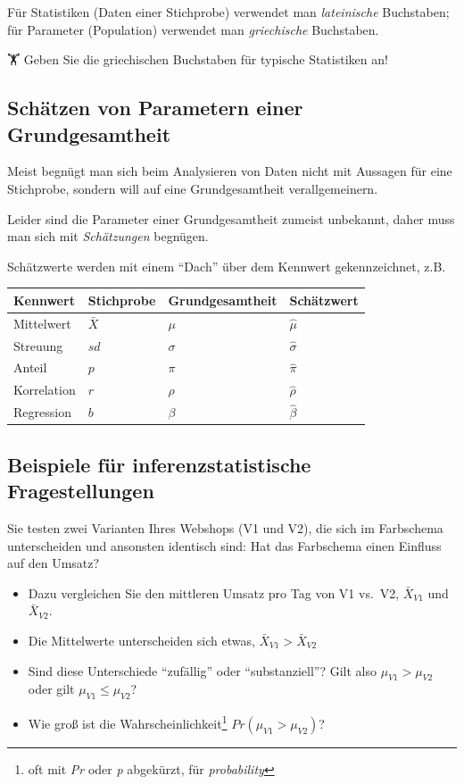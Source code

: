 \documentclass[
  a4paper,
  DIV=11]{scrreprt}
\theoremstyle{definition}
\theoremstyle{remark}
\begin{document}
Für Statistiken (Daten einer Stichprobe) verwendet man
\emph{lateinische} Buchstaben; für Parameter (Population) verwendet man
\emph{griechische} Buchstaben.

🏋️ Geben Sie die griechischen Buchstaben für typische Statistiken an!

\hypertarget{schuxe4tzen-von-parametern-einer-grundgesamtheit}{%
\subsection{Schätzen von Parametern einer
Grundgesamtheit}\label{schuxe4tzen-von-parametern-einer-grundgesamtheit}}

Meist begnügt man sich beim Analysieren von Daten nicht mit Aussagen für
eine Stichprobe, sondern will auf eine Grundgesamtheit verallgemeinern.

Leider sind die Parameter einer Grundgesamtheit zumeist unbekannt, daher
muss man sich mit \emph{Schätzungen} begnügen.

Schätzwerte werden mit einem ``Dach'' über dem Kennwert gekennzeichnet,
z.B.

\begin{longtable}[]{@{}llll@{}}
\toprule()
Kennwert & Stichprobe & Grundgesamtheit & Schätzwert \\
\midrule()
\endhead
Mittelwert & \(\bar{X}\) & \(\mu\) & \(\hat{\mu}\) \\
Streuung & \(sd\) & \(\sigma\) & \(\hat{\sigma}\) \\
Anteil & \(p\) & \(\pi\) & \(\hat{\pi}\) \\
Korrelation & \(r\) & \(\rho\) & \(\hat{\rho}\) \\
Regression & \(b\) & \(\beta\) & \(\hat{\beta}\) \\
\bottomrule()
\end{longtable}

\hypertarget{beispiele-fuxfcr-inferenzstatistische-fragestellungen}{%
\subsection{Beispiele für inferenzstatistische
Fragestellungen}\label{beispiele-fuxfcr-inferenzstatistische-fragestellungen}}

Sie testen zwei Varianten Ihres Webshops (V1 und V2), die sich im
Farbschema unterscheiden und ansonsten identisch sind: Hat das
Farbschema einen Einfluss auf den Umsatz?

\begin{itemize}
\item
  Dazu vergleichen Sie den mittleren Umsatz pro Tag von V1 vs.~V2,
  \(\bar{X}_{V1}\) und \(\bar{X}_{V2}\).
\item
  Die Mittelwerte unterscheiden sich etwas,
  \(\bar{X}_{V1} > \bar{X}_{V2}\)
\item
  Sind diese Unterschiede ``zufällig'' oder ``substanziell''? Gilt also
  \(\mu_{V1} > \mu_{V2}\) oder gilt \(\mu_{V1} \le \mu_{V2}\)?
\item
  Wie groß ist die Wahrscheinlichkeit\footnote{oft mit \emph{Pr} oder
    \emph{p} abgekürzt, für \emph{probability}}
  \(Pr(\mu_{V1} > \mu_{V2})\)?
\end{itemize}
\end{document}
